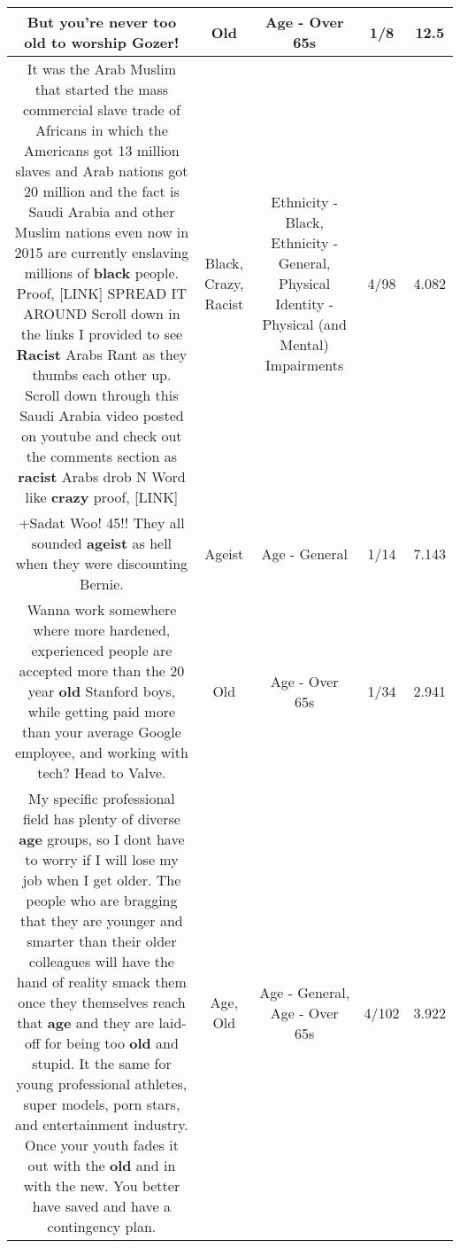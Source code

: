 \documentclass[11pt]{article}
\newlength\mylength
\begin{document}
\begin{center}
\begin{longtable}{|C{.65\mylength}|C{.30\mylength}|C{.12\mylength}|C{.12\mylength}|C{.12\mylength}|}
  \small But you're never too \textbf{old} to worship Gozer!\normalsize   & Old & Age - Over 65s & 1/8 & 12.5 \\  \hline
  \small It was the Arab Muslim that started the mass commercial slave trade of Africans in which the Americans got 13 million slaves and Arab nations got 20 million and the fact is Saudi Arabia and other Muslim nations even now in 2015 are currently enslaving millions of \textbf{black} people. Proof,   [LINK]  SPREAD IT AROUND  Scroll down in the  links I provided to see \textbf{Racist} Arabs Rant as they thumbs each other up. Scroll down through this Saudi Arabia video posted on youtube and check out the comments section as \textbf{racist} Arabs drob N Word like \textbf{crazy} proof,  [LINK] \normalsize   & Black, Crazy, Racist & Ethnicity - Black, Ethnicity - General, Physical Identity - Physical (and Mental) Impairments & 4/98 & 4.082 \\  \hline
  \small +Sadat  Woo!  45!! They all sounded \textbf{ageist} as hell when they were discounting Bernie.\normalsize   & Ageist & Age - General & 1/14 & 7.143 \\  \hline
  \small Wanna work somewhere where more hardened, experienced people are accepted more than the 20 year \textbf{old} Stanford boys, while getting paid more than your average Google employee, and working with tech? Head to Valve.\normalsize   & Old & Age - Over 65s & 1/34 & 2.941 \\  \hline
  \small My specific professional field has plenty of diverse \textbf{age} groups, so I dont have to worry if I will lose my job when I get older. The people who are bragging that they are younger and smarter than their older colleagues will have the hand of reality  smack them once they themselves reach that \textbf{age} and they are laid-off for being too \textbf{old} and stupid. It the same for young professional athletes, super models, porn stars, and entertainment industry. Once your youth fades it out with the \textbf{old} and in with the new. You better have saved and have a contingency plan.\normalsize   & Age, Old & Age - General, Age - Over 65s & 4/102 & 3.922 \\  \hline

\end{longtable}
\end{center}
\end{document}
